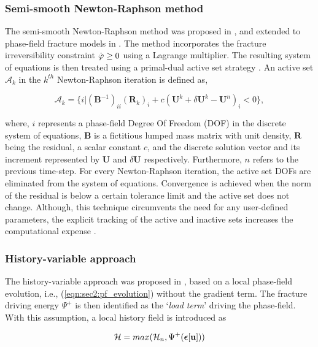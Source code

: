 \documentclass[11pt]{article}
\begin{document}
\subsubsection{Semi-smooth Newton-Raphson method}

The semi-smooth Newton-Raphson method was proposed in \cite{Hintermuller2002}, and extended to phase-field fracture models in \cite{Heister2015}. The method incorporates the fracture irreversibility constraint $\dot{\hbox{$\varphi$}} \geq 0$ using a Lagrange multiplier. The resulting system of equations is then treated using a primal-dual active set strategy \cite{Hintermuller2002}. An active set $\mathcal{A}_k$ in the $k^{th}$ Newton-Raphson iteration is defined as,

\begin{equation}\label{eqn:activeSet}
\mathcal{A}_k = \{ i | (\mathbf{B}^{-1})_{ii} (\mathbf{R}_k)_i + c ( \mathbf{U}^{k} + \delta \mathbf{U}^k - \mathbf{U}^n )_i < 0 \},
\end{equation}

where, $i$ represents a phase-field Degree Of Freedom (DOF) in the discrete system of equations, $\mathbf{B}$ is a fictitious lumped mass matrix with unit density, $\mathbf{R}$ being the residual, a scalar constant $c$, and the discrete solution vector and its increment represented by $\mathbf{U}$ and $\delta \mathbf{U}$ respectively. Furthermore, $n$ refers to the previous time-step. For every Newton-Raphson iteration, the active set DOFs are eliminated from the system of equations. Convergence is achieved when the norm of the residual is below a certain tolerance limit and the active set does not change. Although, this technique circumvents the need for any user-defined parameters, the explicit tracking of the active and inactive sets increases the computational expense \cite{de2020numerical}.

\subsubsection{History-variable approach}

The history-variable approach was proposed in \cite{Miehe2010}, based on a local phase-field evolution, i.e., (\ref{eqn:sec2:pf_evolution}) without the gradient term. The fracture driving energy $\Psi^+$ is then identified as the `\textit{load term}' driving the phase-field. With this assumption, a local history field is introduced as

\begin{equation}
\mathcal{H} = max ( \mathcal{H}_{n}, \Psi^+(\hbox{$\hbox{\boldmath$\epsilon$}$}[\hbox{$\mathbf{u}$}]) )
\end{equation}
\end{document}
